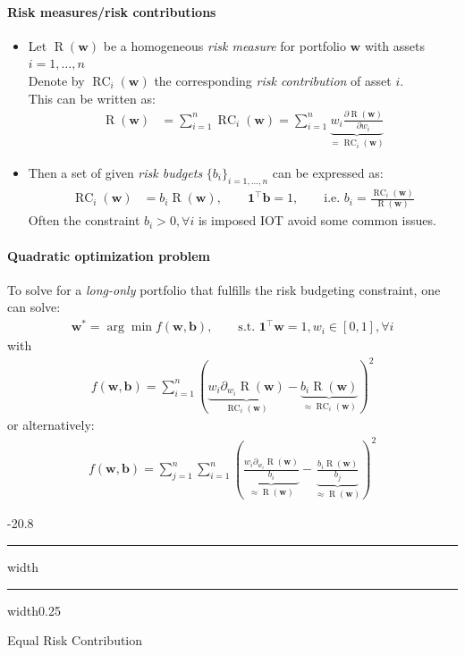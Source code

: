 \documentclass[a4paper,landscape,8pt,fleqn]{scrartcl}
\makeatletter
\renewcommand{\subsection}{\@startsection{subsection}{1}{0mm}%
{-2\baselineskip}{0.8\baselineskip}%
{\hrule depth 0.2pt width\columnwidth\hrule depth0.75pt
width0.25\columnwidth\vspace*{1.2em}\large\bfseries}}
\DeclareMathOperator{\R}{R}						%
\DeclareMathOperator{\RC}{RC}					%
\makeatother
\begin{document}
\begin{multicols*}{3}
\paragraph{Risk measures/risk contributions}
\begin{itemize}
\item Let $\R(\bm w)$ be a homogeneous \textit{risk measure} for portfolio $\bm w$ with assets $i = 1,\ldots,n$ \\
Denote by $\RC_i(\bm w)$ the corresponding \textit{risk contribution} of asset $i$. \\
This can be written as:
\begin{align*}
\R(\bm w) &= \sum_{i=1}^n \RC_i(\bm w) = \sum_{i=1}^n \underbrace{w_i \frac{\partial \R(\bm w)}{\partial w_i}}_{= \RC_i(\bm w)}
\end{align*}
\item Then a set of given \textit{risk budgets} $\lbrace b_i \rbrace_{i=1,\ldots,n}$ can be expressed as:
\begin{align*}
\RC_i(\bm w) &= b_i \R(\bm w), \qquad \bm 1^\top \bm b = 1, \qquad \text{i.e. } b_i = \frac{\RC_i(\bm w)}{\R(\bm w)}
\end{align*}
Often the constraint $b_i > 0, \forall i$ is imposed IOT avoid some common issues.
\end{itemize}

\paragraph{Quadratic optimization problem}
To solve for a \textit{long-only} portfolio that fulfills the risk budgeting constraint, one can solve:
\begin{align*}
\bm w^\ast = \arg\min f(\bm w, \bm b), \qquad \text{s.t. } \bm 1^\top \bm w = 1, w_i \in [0,1], \forall i
\end{align*}
with
\begin{align*}
f(\bm w, \bm b) = \sum_{i=1}^n \left( \underbrace{w_i \partial_{w_i} \R(\bm w)}_{\RC_i(\bm w)} - \underbrace{b_i \R(\bm w)}_{\approx \RC_i(\bm w)} \right)^2
\end{align*}
or alternatively:
\begin{align*}
f(\bm w, \bm b) = \sum_{j=1}^n \sum_{i=1}^n \left( \underbrace{\frac{w_i \partial_{w_i} \R(\bm w)}{b_i}}_{\approx \R(\bm w)} - \underbrace{\frac{b_i \R(\bm w)}{b_j}}_{\approx \R(\bm w)} \right)^2
\end{align*}

\subsection{Equal Risk Contribution}


\end{multicols*}
\end{document}
